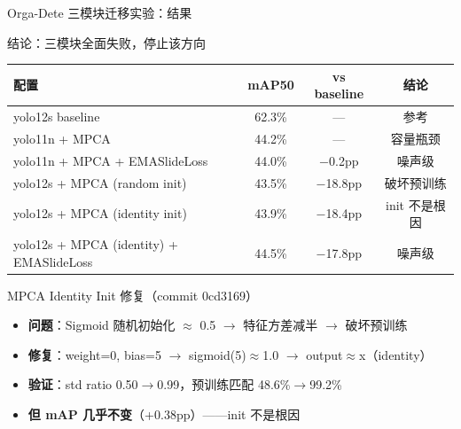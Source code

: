 \documentclass[aspectratio=169, 10pt]{beamer}
\begin{document}
\begin{frame}{Orga-Dete 三模块迁移实验：结果}
  \begin{alertblock}{结论：三模块全面失败，停止该方向}
    \begin{tabular}{lccc}
      \toprule
      \textbf{配置} & \textbf{mAP50} & \textbf{vs baseline} & \textbf{结论} \\
      \midrule
      yolo12s baseline & 62.3\% & — & 参考 \\
      yolo11n + MPCA & 44.2\% & — & 容量瓶颈 \\
      yolo11n + MPCA + EMASlideLoss & 44.0\% & $-$0.2pp & 噪声级 \\
      yolo12s + MPCA (random init) & 43.5\% & $-$18.8pp & 破坏预训练 \\
      yolo12s + MPCA (identity init) & 43.9\% & $-$18.4pp & init 不是根因 \\
      yolo12s + MPCA (identity) + EMASlideLoss & 44.5\% & $-$17.8pp & 噪声级 \\
      \bottomrule
    \end{tabular}
  \end{alertblock}
  \vspace{0em}
  \begin{block}{MPCA Identity Init 修复（commit 0cd3169）}
    \begin{itemize}
      \item \textbf{问题}：Sigmoid 随机初始化 $\approx$ 0.5 $\rightarrow$ 特征方差减半 $\rightarrow$ 破坏预训练
      \item \textbf{修复}：weight=0, bias=5 $\rightarrow$ sigmoid(5)$\approx$1.0 $\rightarrow$ output$\approx$x（identity）
      \item \textbf{验证}：std ratio 0.50$\rightarrow$0.99，预训练匹配 48.6\%$\rightarrow$99.2\%
      \item \textbf{但 mAP 几乎不变}（+0.38pp）——init 不是根因
    \end{itemize}
  \end{block}
\end{frame}
\end{document}
